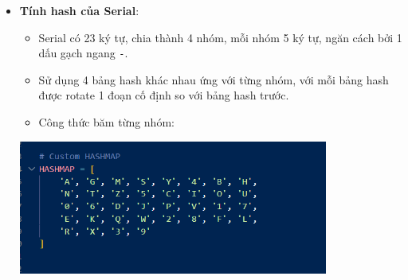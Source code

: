 \begin{itemize}
    \item \textbf{Tính hash của Serial}:
    \begin{itemize}
        \item Serial có 23 ký tự, chia thành 4 nhóm, mỗi nhóm 5 ký tự, ngăn cách bởi 1 dấu gạch ngang \texttt{-}.
        \item Sử dụng 4 bảng hash khác nhau ứng với từng nhóm, với mỗi bảng hash được rotate 1 đoạn cố định so với bảng hash trước.
        \item Công thức băm từng nhóm:
    \end{itemize}
    \begin{center}
        \includegraphics[width=0.8\textwidth]{img/file-2/code2.PNG}

\end{center}
\end{itemize}
